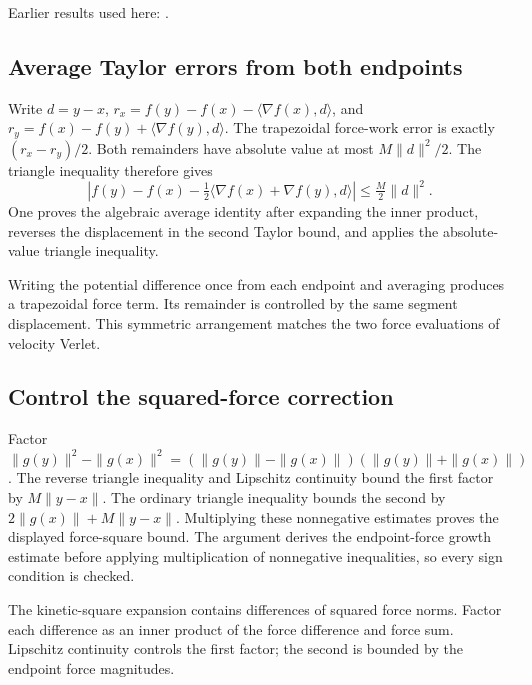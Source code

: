 \documentclass[11pt,a4paper]{report}
\begin{document}
Earlier results used here: \cite[Section~3.9.1]{LangevinLean2026ULASC}.
\subsection{\texorpdfstring{Average Taylor errors from both endpoints}{Average Taylor errors from both endpoints}}
\label{report-step-KineticLangevin-HamiltonianError-lean-2}


Write \(d=y-x\), \(r_x=f(y)-f(x)-\langle\nabla f(x),d\rangle\), and \(r_y=f(x)-f(y)+\langle\nabla f(y),d\rangle\). The trapezoidal force-work error is exactly \((r_x-r_y)/2\). Both remainders have absolute value at most \(M\|d\|^2/2\). The triangle inequality therefore gives \[\left|f(y)-f(x)-\tfrac12\langle\nabla f(x)+\nabla f(y),d\rangle\right|\le\tfrac M2\|d\|^2.\] One proves the algebraic average identity after expanding the inner product, reverses the displacement in the second Taylor bound, and applies the absolute-value triangle inequality.



Writing the potential difference once from each endpoint and averaging produces a trapezoidal force term. Its remainder is controlled by the same segment displacement. This symmetric arrangement matches the two force evaluations of velocity Verlet.

\subsection{\texorpdfstring{Control the squared-force correction}{Control the squared-force correction}}
\label{report-step-KineticLangevin-HamiltonianError-lean-3}


Factor \(\|g(y)\|^2-\|g(x)\|^2=(\|g(y)\|-\|g(x)\|)(\|g(y)\|+\|g(x)\|)\). The reverse triangle inequality and Lipschitz continuity bound the first factor by \(M\|y-x\|\). The ordinary triangle inequality bounds the second by \(2\|g(x)\|+M\|y-x\|\). Multiplying these nonnegative estimates proves the displayed force-square bound. The argument derives the endpoint-force growth estimate before applying multiplication of nonnegative inequalities, so every sign condition is checked.



The kinetic-square expansion contains differences of squared force norms. Factor each difference as an inner product of the force difference and force sum. Lipschitz continuity controls the first factor; the second is bounded by the endpoint force magnitudes.
\end{document}
